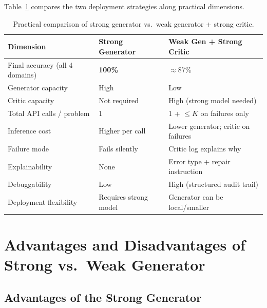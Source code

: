 \documentclass{article}
\begin{document}
Table~\ref{tab:cost} compares the two deployment strategies along practical dimensions.

\begin{table}[h]
\centering
\caption{Practical comparison of strong generator vs.\ weak generator + strong critic.}
\label{tab:cost}
\begin{tabular}{lll}
\toprule
\textbf{Dimension} & \textbf{Strong Generator} & \textbf{Weak Gen + Strong Critic} \\
\midrule
Final accuracy (all 4 domains) & \textbf{100\%}        & $\approx$87\% \\
Generator capacity      & High                  & Low \\
Critic capacity         & Not required          & High (strong model needed) \\
Total API calls / problem & 1                   & 1 + $\leq K$ on failures only \\
Inference cost          & Higher per call       & Lower generator; critic on failures \\
Failure mode            & Fails silently        & Critic log explains why \\
Explainability          & None                  & Error type + repair instruction \\
Debuggability           & Low                   & High (structured audit trail) \\
Deployment flexibility  & Requires strong model & Generator can be local/smaller \\
\bottomrule
\end{tabular}
\end{table}

\section{Advantages and Disadvantages of Strong vs.\ Weak Generator}
\label{sec:gen_comparison}

\subsection{Advantages of the Strong Generator}
\label{sec:strong_adv}
\end{document}
